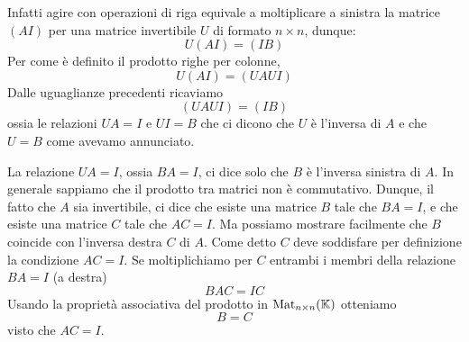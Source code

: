 Infatti agire con operazioni di riga equivale a moltiplicare a sinistra la matrice
$(A I)$ per una matrice invertibile $U$ di formato $n \times n$, dunque:
\[
	U (A I) = (I B)
\]
Per come è definito il prodotto righe per colonne,
\[
	U (A I) = (U A U I)
\]
Dalle uguaglianze precedenti ricaviamo
\[
	(U A U I) = (I B)
\]
ossia le relazioni $U A = I$ e $U I = B$ che ci dicono che $U$ è l'inversa di
$A$ e che $U = B$ come avevamo annunciato.

\begin{observation}
	La relazione $U A = I$, ossia $BA = I$, ci dice solo che $B$ è l'inversa
	sinistra di $A$. In generale sappiamo che il prodotto tra matrici non è
	commutativo. Dunque, il fatto che $A$ sia invertibile, ci dice che esiste una
	matrice $B$ tale che $BA = I$, e che esiste una matrice $C$ tale che $AC = I$.
	Ma possiamo mostrare facilmente che $B$ coincide con l'inversa destra $C$ di
	$A$. Come detto $C$ deve soddisfare per definizione la condizione $AC = I$.
	Se moltiplichiamo per $C$ entrambi i membri della relazione $BA = I$ (a destra)
	\[ BAC = IC \] Usando la proprietà associativa del prodotto in
	$\operatorname{Mat}_{n \times n}(\mathbb{K})$ otteniamo \[B = C\] visto che $AC = I$.
\end{observation}
